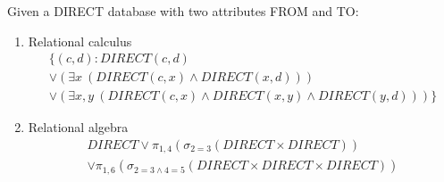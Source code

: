 Given a DIRECT database with two attributes FROM and TO:

\begin{enumerate}
  \item Relational calculus
  \begin{multline*}
    \{(c,d) : DIRECT(c,d) \\ 
    \lor (\exists x \: (DIRECT(c,x) \land DIRECT(x,d))) \\ 
    \lor (\exists x,y \: (DIRECT(c,x) \land DIRECT(x,y) \land DIRECT(y,d)))\}
  \end{multline*}

  \item Relational algebra
  \begin{multline*}
    DIRECT \lor \pi_{1,4}(\sigma_{2=3}(DIRECT \times DIRECT)) \\ 
    \lor \pi_{1,6}(\sigma_{2=3 \land 4=5}(DIRECT \times DIRECT \times DIRECT))
  \end{multline*}
\end{enumerate}